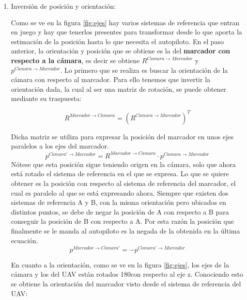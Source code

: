 \begin{enumerate}

\item Inversión de posición y orientación:
	\figEjes

	Como se ve en la figura \ref{fig:ejes} hay varios sistemas de referencia que entran en juego y hay que tenerlos presentes para transformar desde lo que aporta la estimación de la posición hasta lo que necesita el autopiloto. En el paso anterior, la orientación y posición que se obtiene es la del \textbf{marcador con respecto a la cámara}, es decir se obtiene $R^{C\acute{a}mara \rightarrow Marcador}$ y $p^{C\acute{a}mara \rightarrow Marcador}$. Lo primero que se realiza es buscar la orientación de la cámara con respecto al marcador. Para ello tenemos que invertir la orientación dada, la cual al ser una matriz de rotación, se puede obtener mediante su traspuesta:

	\begin{equation}
	R^{Marcador \rightarrow C\acute{a}mara } = \left(R^{C\acute{a}mara \rightarrow Marcador}\right)^T
	\end{equation}


Dicha matriz se utiliza para expresar la posición del marcador en unos ejes paralelos a los ejes del marcador. 
	\begin{equation}
	p^{C\acute{a}mara' \rightarrow Marcador} = R^{Marcador \rightarrow C\acute{a}mara} \cdot p^{C\acute{a}mara \rightarrow Marcador}
	\end{equation}
Nótese que esta posición sigue teniendo origen en la cámara, solo que ahora está rotado el sistema de referencia en el que se expresa. Lo que se quiere obtener es la posición con respecto al sistema de referencia del marcador, el cual es paralelo al que se está expresando ahora. Siempre que existen dos sistemas de referencia A y B, con la misma orientación pero ubicados en distintos puntos, se debe de negar la posición de A con respecto a B para conseguir la posición de B con respecto a A. Por esta razón la posición que finalmente se le manda al autopiloto es la negada de la obtenida en la última ecuación.   
	\begin{equation}
	p^{Marcador \rightarrow C\acute{a}mara' } = - p^{C\acute{a}mara' \rightarrow Marcador}
	\end{equation}

 En cuanto a la orientación, como se ve en la figura \ref{fig:ejes}, los ejes de la cámara y los del UAV están rotados 180\textdegree con respecto al eje z. Conociendo esto se obtiene la orientación del marcador visto desde el sistema de referencia del UAV:


\end{enumerate}

